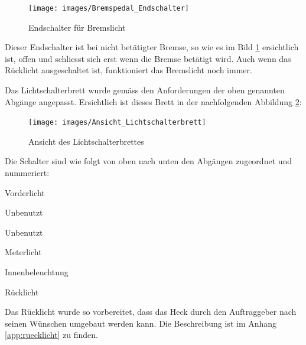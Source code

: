 \begin{itemize}
\begin{figure}[h!]
	\centering
		\texttt{[image: images/Bremspedal\_Endschalter]}
	\caption{Endschalter für Bremslicht}
	\label{fig:EndschalterBremslicht}
\end{figure}

Dieser Endschalter ist bei nicht betätigter Bremse, so wie es im Bild \ref{fig:EndschalterBremslicht} ersichtlich ist, offen und schliesst sich erst wenn die Bremse betätigt wird. Auch wenn das Rücklicht ausgeschaltet ist, funktioniert das Bremslicht noch immer.

\end{itemize}

\newpage

Das Lichtschalterbrett wurde  gemäss den Anforderungen der oben genannten Abgänge angepasst. Ersichtlich ist dieses Brett in der nachfolgenden Abbildung \ref{fig:AnsichtLichtschalterbrett}:

\begin{figure}[h!]
	\centering
		\texttt{[image: images/Ansicht\_Lichtschalterbrett]}
	\caption{Ansicht des Lichtschalterbrettes}
	\label{fig:AnsichtLichtschalterbrett}
\end{figure}

Die Schalter sind wie folgt von oben nach unten den Abgängen zugeordnet und nummeriert:

\begin{compactenum}
\item Vorderlicht
\item Unbenutzt
\item Unbenutzt
\item Meterlicht
\item Innenbeleuchtung
\item Rücklicht
\end{compactenum}

Das Rücklicht wurde so vorbereitet, dass das Heck durch den Auftraggeber nach seinen Wünschen umgebaut werden kann. Die Beschreibung ist im Anhang \ref{app:ruecklicht} zu finden.

\color{black}
\newpage